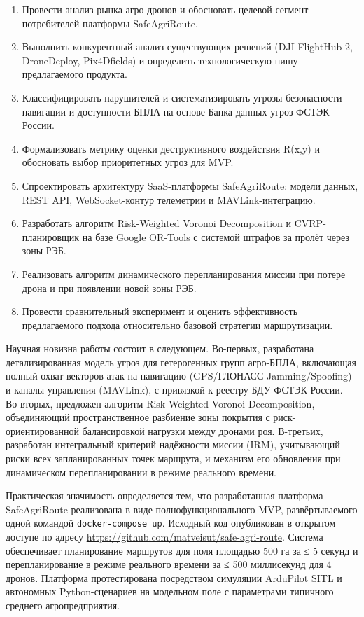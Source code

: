 \documentclass[14pt,a4paper]{extarticle}
\providecommand{\tightlist}{%
  \setlength{\itemsep}{0pt}\setlength{\parskip}{0pt}}
\begin{document}
\begin{enumerate}
\def\labelenumi{\arabic{enumi}.}
\tightlist
\item
  Провести анализ рынка агро-дронов и обосновать целевой сегмент потребителей платформы SafeAgriRoute.
\item
  Выполнить конкурентный анализ существующих решений (DJI FlightHub 2, DroneDeploy, Pix4Dfields) и определить технологическую нишу предлагаемого продукта.
\item
  Классифицировать нарушителей и систематизировать угрозы безопасности навигации и доступности БПЛА на основе Банка данных угроз ФСТЭК России.
\item
  Формализовать метрику оценки деструктивного воздействия R(x,y) и обосновать выбор приоритетных угроз для MVP.
\item
  Спроектировать архитектуру SaaS-платформы SafeAgriRoute: модели данных, REST API, WebSocket-контур телеметрии и MAVLink-интеграцию.
\item
  Разработать алгоритм Risk-Weighted Voronoi Decomposition и CVRP-планировщик на базе Google OR-Tools с системой штрафов за пролёт через зоны РЭБ.
\item
  Реализовать алгоритм динамического перепланирования миссии при потере дрона и при появлении новой зоны РЭБ.
\item
  Провести сравнительный эксперимент и оценить эффективность предлагаемого подхода относительно базовой стратегии маршрутизации.
\end{enumerate}

Научная новизна работы состоит в следующем. Во-первых, разработана детализированная модель угроз для гетерогенных групп агро-БПЛА, включающая полный охват векторов атак на навигацию (GPS/ГЛОНАСС Jamming/Spoofing) и каналы управления (MAVLink), с привязкой к реестру БДУ ФСТЭК России. Во-вторых, предложен алгоритм Risk-Weighted Voronoi Decomposition, объединяющий пространственное разбиение зоны покрытия с риск-ориентированной балансировкой нагрузки между дронами роя. В-третьих, разработан интегральный критерий надёжности миссии (IRM), учитывающий риски всех запланированных точек маршрута, и механизм его обновления при динамическом перепланировании в режиме реального времени.

Практическая значимость определяется тем, что разработанная платформа SafeAgriRoute реализована в виде полнофункционального MVP, развёртываемого одной командой \texttt{docker-compose\ up}. Исходный код опубликован в открытом доступе по адресу \url{https://github.com/matveisut/safe-agri-route}. Система обеспечивает планирование маршрутов для поля площадью 500 га за ≤ 5 секунд и перепланирование в режиме реального времени за ≤ 500 миллисекунд для 4 дронов. Платформа протестирована посредством симуляции ArduPilot SITL и автономных Python-сценариев на модельном поле с параметрами типичного среднего агропредприятия.
\end{document}
